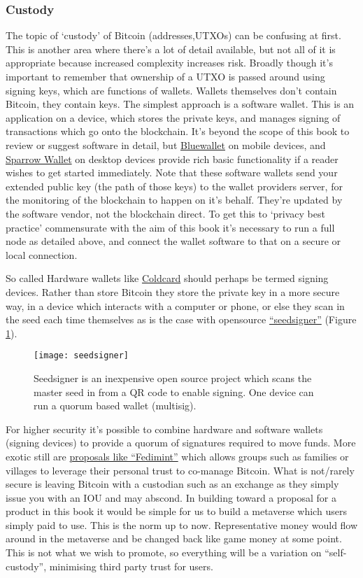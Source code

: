 \subsubsection{Custody}
The topic of `custody' of Bitcoin (addresses,UTXOs) can be confusing at first. This is another area where there's a lot of detail available, but not all of it is appropriate because increased complexity increases risk. Broadly though it's important to remember that ownership of a UTXO is passed around using signing keys, which are functions of wallets. Wallets themselves don't contain Bitcoin, they contain keys. The simplest approach is a software wallet. This is an application on a device, which stores the private keys, and manages signing of transactions which go onto the blockchain. It's beyond the scope of this book to review or suggest software in detail, but \href{https://bluewallet.io/}{Bluewallet} on mobile devices, and \href{https://sparrowwallet.com/}{Sparrow Wallet} on desktop devices provide rich basic functionality if a reader wishes to get started immediately. Note that these software wallets send your extended public key (the path of those keys) to the wallet providers server, for the monitoring of the blockchain to happen on it's behalf. They're updated by the software vendor, not the blockchain direct. To get this to `privacy best practice' commensurate with the aim of this book it's necessary to run a full node as detailed above, and connect the wallet software to that on a secure or local connection.\par
So called Hardware wallets like \href{https://coldcard.com/}{Coldcard} should perhaps be termed signing devices. Rather than store Bitcoin they store the private key in a more secure way, in a device which interacts with a computer or phone, or else they scan in the seed each time themselves as is the case with opensource \href{https://seedsigner.com/}{``seedsigner''} (Figure \ref{fig:seedsigner}).\par

\begin{figure}
  \centering
    \texttt{[image: seedsigner]}
  \caption{Seedsigner is an inexpensive open source project which scans the master seed in from a QR code to enable signing. One device can run a quorum based wallet (multisig).}
    \label{fig:seedsigner}
\end{figure}
For higher security it's possible to combine hardware and software wallets (signing devices) to provide a quorum of signatures required to move funds. More exotic still are \href{https://bitcoinmagazine.com/technical/fediment-evolution-of-bitcoin-custody}{proposals like ``Fedimint''} which allows groups such as families or villages to leverage their personal trust to co-manage Bitcoin. What is not/rarely secure is leaving Bitcoin with a custodian such as an exchange as they simply issue you with an IOU and may abscond. In building toward a proposal for a product in this book it would be simple for us to build a metaverse which users simply paid to use. This is the norm up to now. Representative money would flow around in the metaverse and be changed back like game money at some point. This is not what we wish to promote, so everything will be a variation on ``self-custody'', minimising third party trust for users.
